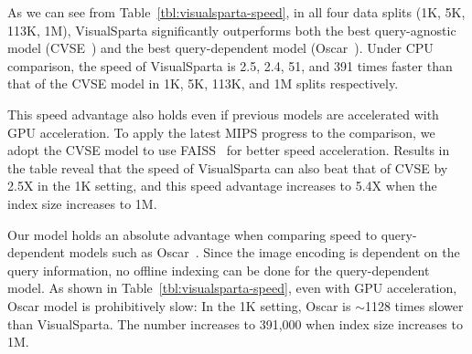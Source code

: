 As we can see from Table~\ref{tbl:visualsparta-speed}, in all four data splits (1K, 5K, 113K, 1M), VisualSparta significantly outperforms both the best query-agnostic model (CVSE~\cite{wang2020consensus}) and the best query-dependent model (Oscar~\cite{li2020oscar}). Under CPU comparison, the speed of VisualSparta is 2.5, 2.4, 51, and 391 times faster than that of the CVSE model in 1K, 5K, 113K, and 1M splits respectively.

This speed advantage also holds even if previous models are accelerated with GPU acceleration. To apply the latest MIPS progress to the comparison, we adopt the CVSE model to use FAISS~\cite{johnson2019billion} for better speed acceleration. Results in the table reveal that the speed of VisualSparta can also beat that of CVSE by 2.5X in the 1K setting, and this speed advantage increases to 5.4X when the index size increases to 1M. 

Our model holds an absolute advantage when comparing speed to query-dependent models such as Oscar~\cite{li2020oscar}. Since the image encoding is dependent on the query information, no offline indexing can be done for the query-dependent model. As shown in Table~\ref{tbl:visualsparta-speed}, even with GPU acceleration, Oscar model is prohibitively slow: In the 1K setting, Oscar is $\sim$1128 times slower than VisualSparta. The number increases to 391,000 when index size increases to 1M. 








